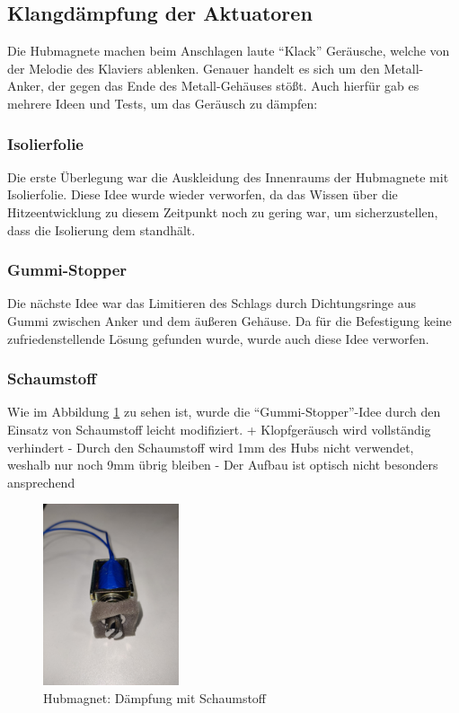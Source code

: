 \subsection{Klangdämpfung der Aktuatoren}


Die Hubmagnete machen beim Anschlagen laute \enquote{Klack} Geräusche, welche von der Melodie des Klaviers ablenken.
Genauer handelt es sich um den Metall-Anker, der gegen das Ende des Metall-Gehäuses stößt.
Auch hierfür gab es mehrere Ideen und Tests, um das Geräusch zu dämpfen:

\subsubsection{Isolierfolie}

Die erste Überlegung war die Auskleidung des Innenraums der Hubmagnete mit Isolierfolie.
Diese Idee wurde wieder verworfen, da das Wissen über die Hitzeentwicklung zu diesem Zeitpunkt noch zu gering war, um sicherzustellen, dass die Isolierung dem standhält. %

\subsubsection{Gummi-Stopper}

Die nächste Idee war das Limitieren des Schlags durch Dichtungsringe aus Gummi
zwischen Anker und dem äußeren Gehäuse.
Da für die Befestigung keine zufriedenstellende Lösung gefunden wurde, wurde auch diese Idee verworfen.

\subsubsection{Schaumstoff}

Wie im Abbildung \ref{fig:schaumstoff} zu sehen ist, wurde die \enquote{Gummi-Stopper}-Idee durch den Einsatz von Schaumstoff leicht modifiziert. \newline
+ Klopfgeräusch wird vollständig verhindert \newline
- Durch den Schaumstoff wird 1mm des Hubs nicht verwendet, weshalb nur noch 9mm übrig bleiben \newline
- Der Aufbau ist optisch nicht besonders ansprechend

\begin{figure}[htbp]
    \centering
    \includegraphics [width=4cm] {img/Daempfung_Schaumstoff}
    \caption{Hubmagnet: Dämpfung mit Schaumstoff}
    \label{fig:schaumstoff}
\end{figure}

